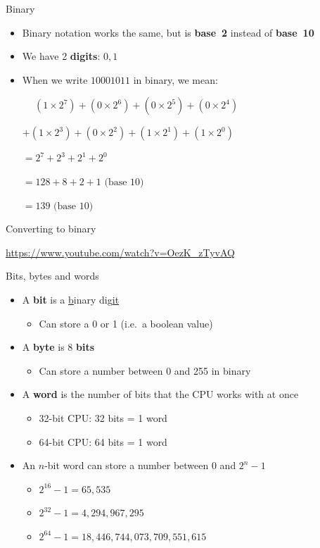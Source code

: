 \begin{frame}{Binary}
	\begin{itemize}
		\pause\item Binary notation works the same, but is \textbf{base~2} instead of \textbf{base~10}
		\pause\item We have 2 \textbf{digits}: $0, 1$
		\pause\item When we write $10001011$ in binary, we mean: \par\pause
			$\phantom{+} \left(1 \times 2^7\right) + 
			\left(0 \times 2^6\right) + 
			\left(0 \times 2^5\right) + 
			\left(0 \times 2^4\right)$ \par
			$+ \left(1 \times 2^3\right) + 
			\left(0 \times 2^2\right) + 
			\left(1 \times 2^1\right) + 
			\left(1 \times 2^0\right)$ \par\pause
			$= 2^7 + 2^3 + 2^1 + 2^0$ \par\pause
			$= 128 + 8 + 2 + 1 \text{ (base 10)}$ \par\pause
			$= 139 \text{ (base 10)}$
	\end{itemize}
\end{frame}

\begin{frame}{Converting to binary}
    \begin{center}
        \url{https://www.youtube.com/watch?v=OezK_zTyvAQ}
    \end{center}
\end{frame}

\begin{frame}{Bits, bytes and words}
	\begin{itemize}
		\pause\item A \textbf{bit} is a \uline{b}inary dig\uline{it}
			\begin{itemize}
				\pause\item Can store a 0 or 1 (i.e.\ a boolean value)
			\end{itemize}
		\pause\item A \textbf{byte} is 8 \textbf{bits}
			\begin{itemize}
				\pause\item Can store a number between 0 and 255 in binary
			\end{itemize}
		\pause\item A \textbf{word} is the number of bits that the CPU works with at once
			\begin{itemize}
				\pause\item 32-bit CPU: 32 bits = 1 word
				\pause\item 64-bit CPU: 64 bits = 1 word
			\end{itemize}
		\pause\item An $n$-bit word can store a number between 0 and $2^{n} - 1$
			\begin{itemize}
				\pause\item $2^{16}-1 = 65,535$
				\pause\item $2^{32}-1 = 4,294,967,295$
				\pause\item $2^{64}-1 = 18,446,744,073,709,551,615$
			\end{itemize}
	\end{itemize}
\end{frame}

